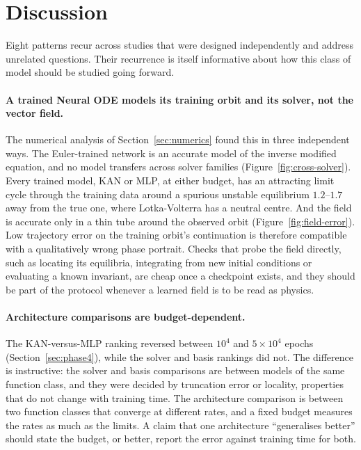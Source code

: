 \section{Discussion}
\label{sec:discussion}

Eight patterns recur across studies that were designed independently and
address unrelated questions. Their recurrence is itself informative about how
this class of model should be studied going forward.

\paragraph{A trained Neural ODE models its training orbit and its solver, not
the vector field.} The numerical analysis of Section~\ref{sec:numerics}
found this in three independent ways. The Euler-trained network is an
accurate model of the inverse modified equation, and no model transfers
across solver families (Figure~\ref{fig:cross-solver}). Every trained model,
KAN or MLP, at either budget, has an attracting limit cycle through the
training data around a spurious unstable equilibrium $1.2$--$1.7$ away from
the true one, where Lotka-Volterra has a neutral centre. And the field is
accurate only in a thin tube around the observed orbit
(Figure~\ref{fig:field-error}). Low trajectory error on the training orbit's
continuation is therefore compatible with a qualitatively wrong phase
portrait. Checks that probe the field directly, such as locating its
equilibria, integrating from new initial conditions or evaluating a known
invariant, are cheap once a checkpoint exists, and they should be part of
the protocol whenever a learned field is to be read as physics.

\paragraph{Architecture comparisons are budget-dependent.} The
KAN-versus-MLP ranking reversed between $10^4$ and $5\times10^4$ epochs
(Section~\ref{sec:phase4}), while the solver and basis rankings did not. The
difference is instructive: the solver and basis comparisons are between
models of the same function class, and they were decided by truncation error
or locality, properties that do not change with training time. The
architecture comparison is between two function classes that converge at
different rates, and a fixed budget measures the rates as much as the
limits. A claim that one architecture ``generalises better'' should state
the budget, or better, report the error against training time for both.

